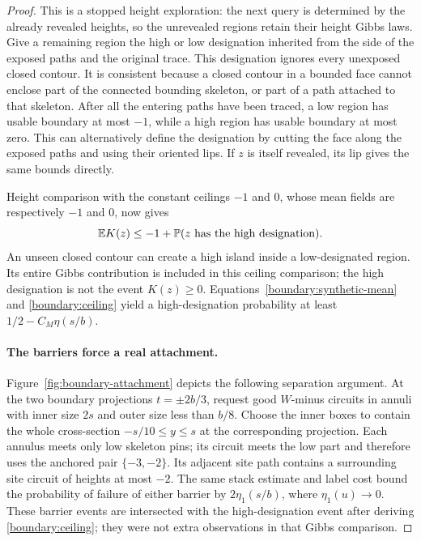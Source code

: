\documentclass[11pt]{article}
\newcommand{\E}{\mathbb E}
\newcommand{\Prob}{\mathbb P}
\theoremstyle{definition}
\theoremstyle{remark}
\numberwithin{equation}{section}
\begin{document}
\begin{proof}
This is a stopped height exploration: the next query is determined
by the already revealed heights, so the unrevealed regions retain
their height Gibbs laws.  Give a remaining region the high or low
designation inherited from the side of the exposed paths and the
original trace.  This designation ignores every unexposed closed
contour.  It is consistent because a closed contour in a bounded
face cannot enclose part of the connected bounding skeleton, or
part of a path attached to that skeleton.  After all the entering
paths have been traced, a low region has usable boundary at most
$-1$, while a high region has usable boundary at most zero.  This
can alternatively define the designation by cutting the face along
the exposed paths and using their oriented lips.  If $z$ is itself
revealed, its lip gives the same bounds directly.

Height comparison with the constant ceilings $-1$ and $0$, whose
mean fields are respectively $-1$ and $0$, now gives
\begin{equation}
 \E K(z)\le -1+\Prob(z\hbox{ has the high designation}).
 \label{boundary:ceiling}
\end{equation}
An unseen closed contour can create a high island inside a
low-designated region.  Its entire Gibbs contribution is included
in this ceiling comparison; the high designation is not the event
$K(z)\ge0$.  Equations~\eqref{boundary:synthetic-mean} and
\eqref{boundary:ceiling} yield a high-designation probability at
least $1/2-C_M\eta(s/b)$.

\paragraph{The barriers force a real attachment.}
Figure~\ref{fig:boundary-attachment} depicts the following separation
argument.
At the two boundary projections $t=\pm2b/3$, request good $W$-minus
circuits in annuli with inner size $2s$ and outer size less than
$b/8$.  Choose the inner boxes to contain the whole cross-section
$-s/10\le y\le s$ at the corresponding projection.  Each annulus
meets only low skeleton pins; its circuit meets the low part and
therefore uses the anchored pair $\{-3,-2\}$.  Its adjacent site
path contains a surrounding site circuit of heights at most $-2$.
The same stack estimate and label cost bound the probability of
failure of either barrier by $2\eta_1(s/b)$, where
$\eta_1(u)\to0$.  These barrier events are intersected with the
high-designation event after deriving \eqref{boundary:ceiling}; they
were not extra observations in that Gibbs comparison.


\end{proof}
\end{document}
